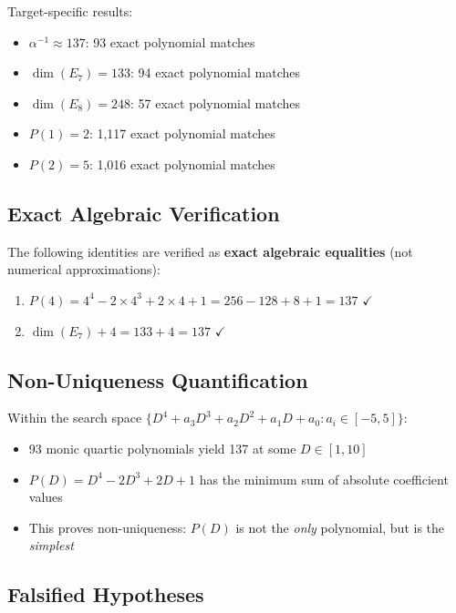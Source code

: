 \documentclass[11pt,a4paper]{article}
\begin{document}
Target-specific results:
\begin{itemize}
    \item $\alpha^{-1} \approx 137$: 93 exact polynomial matches
    \item $\dim(E_7) = 133$: 94 exact polynomial matches
    \item $\dim(E_8) = 248$: 57 exact polynomial matches
    \item $P(1) = 2$: 1,117 exact polynomial matches
    \item $P(2) = 5$: 1,016 exact polynomial matches
\end{itemize}

\subsection{Exact Algebraic Verification}

The following identities are verified as \textbf{exact algebraic equalities} (not numerical approximations):

\begin{enumerate}
    \item $P(4) = 4^4 - 2 \times 4^3 + 2 \times 4 + 1 = 256 - 128 + 8 + 1 = 137$ \quad $\checkmark$
    \item $\dim(E_7) + 4 = 133 + 4 = 137$ \quad $\checkmark$
\end{enumerate}

\subsection{Non-Uniqueness Quantification}

Within the search space $\{D^4 + a_3 D^3 + a_2 D^2 + a_1 D + a_0 : a_i \in [-5,5]\}$:

\begin{itemize}
    \item 93 monic quartic polynomials yield 137 at some $D \in [1,10]$
    \item $P(D) = D^4 - 2D^3 + 2D + 1$ has the minimum sum of absolute coefficient values
    \item This proves non-uniqueness: $P(D)$ is not the \textit{only} polynomial, but is the \textit{simplest}
\end{itemize}

\subsection{Falsified Hypotheses}
\end{document}
